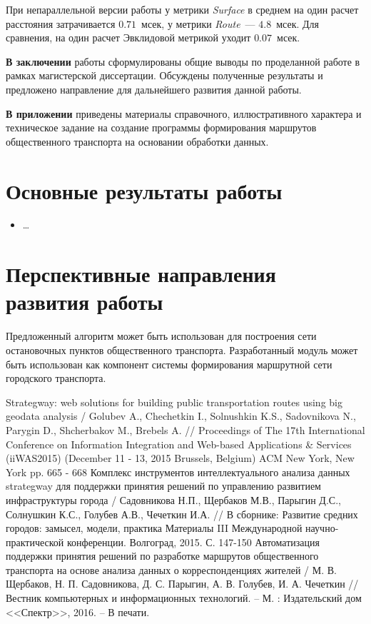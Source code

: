 При непараллельной версии работы у метрики \emph{Surface} в среднем на один расчет расстояния затрачивается \( 0.71 \)~мсек, у метрики \emph{Route}~--- \( 4.8 \)~мсек. Для сравнения, на один расчет Эвклидовой метрикой уходит \( 0.07 \)~мсек.

\textbf{В заключении} работы сформулированы общие выводы по проделанной работе в рамках магистерской диссертации. Обсуждены полученные результаты и предложено направление для дальнейшего развития данной работы.

\textbf{В приложении} приведены материалы справочного, иллюстративного характера и техническое задание на создание программы формирования маршрутов общественного транспорта на основании обработки данных.

\section{Основные результаты работы}
\begin{itemize}
    \item \ldots
\end{itemize}

\section{Перспективные направления развития работы}
Предложенный алгоритм может быть использован для построения сети остановочных пунктов общественного транспорта.
Разработанный модуль может быть использован как компонент системы формирования маршрутной сети городского транспорта.

\renewcommand{\bibname}{Публикации по теме диссертации}
\begin{thebibliography}{10}
     Strategway: web solutions for building public transportation routes using big geodata 
        analysis / Golubev A., Chechetkin I., Solnushkin K.S., Sadovnikova N., Parygin D., Shcherbakov M., 
        Brebels A. // Proceedings of The 17th International Conference on Information Integration and 
        Web-based Applications \& Services (iiWAS2015) (December 11 - 13, 2015 Brussels, Belgium) 
        ACM New York, New York pp. 665 - 668
     Комплекс инструментов интеллектуального анализа данных strategway для поддержки 
        принятия решений по управлению развитием инфраструктуры города / Садовникова Н.П., Щербаков М.В., 
        Парыгин Д.С., Солнушкин К.С., Голубев А.В., Чечеткин И.А. // В сборнике: Развитие средних 
        городов: замысел, модели, практика Материалы III Международной научно-практической конференции. 
        Волгоград, 2015. С. 147-150
     Автоматизация поддержки принятия решений по разработке маршрутов общественного 
        транспорта на основе анализа данных о корреспонденциях жителей / М. В. Щербаков, 
        Н. П. Садовникова, Д. С. Парыгин, А. В. Голубев, И. А. Чечеткин // Вестник компьютерных и 
        информационных технологий. -- М. : Издательский дом <<Спектр>>, 2016. -- В печати.
\end{thebibliography}
